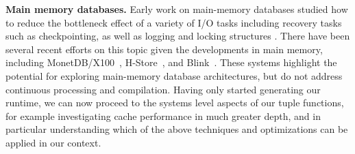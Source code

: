 \noindent \textbf{Main memory databases.}
Early work on main-memory databases studied how to reduce the bottleneck effect
of a variety of I/O tasks including recovery tasks such as checkpointing, as well
as logging and locking structures \cite{bohannon-sigmod:99}. There have been
several recent efforts on this topic given the developments in main memory,
including MonetDB/X100~\cite{boncz-cidr:05}, H-Store~\cite{kallman-pvldb:08},
and Blink~\cite{raman-icde:08}.
These systems highlight the potential for exploring main-memory database
architectures, but do not address continuous processing and compilation. Having
only started generating our runtime, we can now proceed to the systems level
aspects of our tuple functions, for example investigating cache performance in
much greater depth, and in particular understanding which of the above
techniques and optimizations can be applied in our context.
